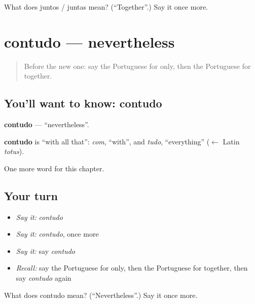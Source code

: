 \begin{tcolorbox}[breakable,colback=teal!4,colframe=teal!35!black,title={Before you move on}]
What does juntos / juntas mean? (\textquotedblleft{}Together\textquotedblright{}.) Say it once more.
\end{tcolorbox}
\section[contudo]{contudo — nevertheless}

\label{lesson:PT-C214-contudo}



\begin{quote}
Before the new one: say the Portuguese for only, then the Portuguese for together.
\end{quote}

\subsection*{You'll want to know: contudo}
\textbf{contudo} — \textquotedblleft{}nevertheless\textquotedblright{}.

\begin{cousinweb}
\textbf{contudo} is \textquotedblleft{}with all that\textquotedblright{}: \emph{com}, \textquotedblleft{}with\textquotedblright{}, and \emph{tudo}, \textquotedblleft{}everything\textquotedblright{} ($\leftarrow$ Latin \emph{totus}).
\end{cousinweb}

\begin{grammarlens}[title={What you've built}]
One more word for this chapter.
\end{grammarlens}

\subsection*{Your turn}
\begin{itemize}
\raggedright
  \item \emph{Say it:} \emph{contudo}
  \item \emph{Say it:} \emph{contudo}, once more
  \item \emph{Say it:} say \emph{contudo}
  \item \emph{Recall:} say the Portuguese for only, then the Portuguese for together, then say \emph{contudo} again
\end{itemize}

\begin{tcolorbox}[breakable,colback=teal!4,colframe=teal!35!black,title={Before you move on}]
What does contudo mean? (\textquotedblleft{}Nevertheless\textquotedblright{}.) Say it once more.
\end{tcolorbox}
